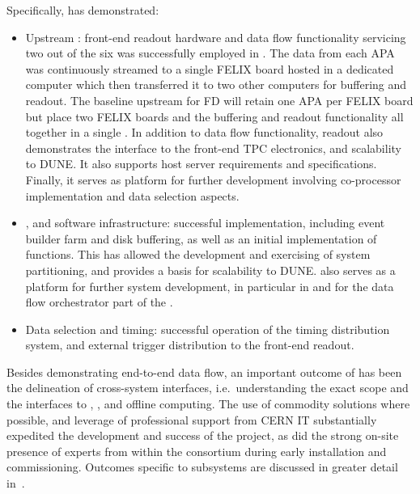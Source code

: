 Specifically,  has demonstrated: 
\begin{itemize}
\item Upstream : front-end readout hardware and data flow functionality servicing two out of the six  was successfully employed in .
  The data from each APA was continuously streamed to a single FELIX board hosted in a dedicated computer which then transferred it to two other computers for buffering and readout.
  The baseline upstream  for  FD will retain one APA per FELIX board but place two FELIX boards and the buffering and readout functionality all together in a single . 
  In addition to data flow functionality,   readout also demonstrates the interface to the front-end TPC electronics, and scalability to DUNE. It also supports host server requirements and specifications. Finally, it serves as platform for further development involving co-processor implementation and data selection aspects.
\item {},  and software infrastructure:
 successful  implementation, including event builder
  farm and disk buffering, as well as an initial implementation of  functions. This has allowed the
  development and exercising of system partitioning, and provides a
  basis for scalability to DUNE.  also serves as
  a platform for further system development, in particular in  and for the data flow orchestrator part of the
  .
\item Data selection and timing: successful operation of the timing
  distribution system, and external trigger distribution to the
  front-end readout.
\end{itemize}

Besides demonstrating end-to-end data flow, an important outcome of
 has been the delineation of cross-system
interfaces, i.e.~understanding the exact  scope and the interfaces to , , and offline computing. The use of commodity solutions
where possible, and leverage of professional support from CERN IT 
substantially expedited the development and success of the project, as
did the strong on-site presence of experts from within the consortium during early installation and
commissioning. 
Outcomes specific to  subsystems are discussed in
greater detail in~\cite{Hennessy:CDRReview}. 

